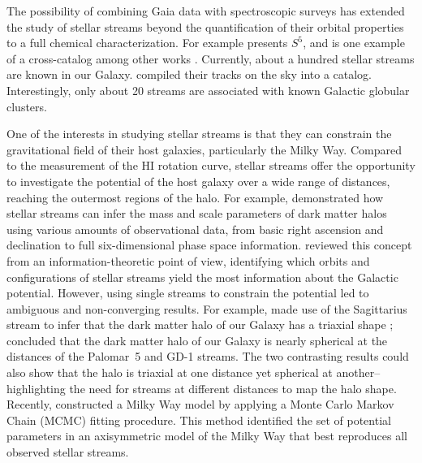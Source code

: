 \documentclass{aa}
\begin{document}
  The possibility of combining Gaia data with spectroscopic surveys has extended the study of stellar streams beyond the quantification of their orbital properties to a full chemical characterization. For example \citet{2019MNRAS.490.3508L} presents $S^5$, and is one example of a cross-catalog among other works \citep{2020AJ....160..181J, 2021ApJ...911..149L, 2022ApJ...928...30L, 2024MNRAS.529.2413U}. Currently, about a hundred stellar streams are known in our Galaxy. \citet{2023MNRAS.520.5225M} compiled their tracks on the sky into a catalog. Interestingly, only about 20 streams are associated with known Galactic globular clusters.

  One of the interests in studying stellar streams is that they can constrain the gravitational field of their host galaxies, particularly the Milky Way. Compared to the measurement of the HI rotation curve, stellar streams offer the opportunity to investigate the potential of the host galaxy over a wide range of distances, reaching the outermost regions of the halo. For example, \citet{2011MNRAS.417..198V} demonstrated how stellar streams can infer the mass and scale parameters of dark matter halos using various amounts of observational data, from basic right ascension and declination to full six-dimensional phase space information. \citet{2018ApJ...867..101B} reviewed this concept from an information-theoretic point of view, identifying which orbits and configurations of stellar streams yield the most information about the Galactic potential. However, using single streams to constrain the potential led to ambiguous and non-converging results. For example, \citet{2010ApJ...718.1128L} made use of the Sagittarius stream to infer that the dark matter halo of our Galaxy has a triaxial shape \citep[but see also][]{2004MNRAS.351..643H, 2005ApJ...619..800J, 2005ApJ...619..807L}; \citet{2016ApJ...833...31B} concluded that the dark matter halo of our Galaxy is nearly spherical at the distances of the Palomar~5 and GD-1 streams. The two contrasting results could also show that the halo is triaxial at one distance yet spherical at another--highlighting the need for streams at different distances to map the halo shape. Recently, \citet{2024ApJ...967...89I} constructed a Milky Way model by applying a Monte Carlo Markov Chain (MCMC) fitting procedure. This method identified the set of potential parameters in an axisymmetric model of the Milky Way that best reproduces all observed stellar streams.
\end{document}

